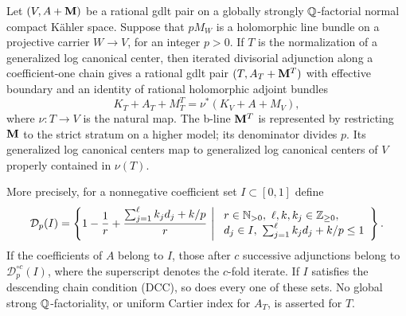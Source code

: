 \begin{lemma}
\label{lem:stratum-adjunction}
Let $(V,A+\mathbf M)$ be a rational gdlt pair on a globally strongly
$\mathbb Q$-factorial normal compact K\"ahler space.  Suppose that $pM_W$
is a holomorphic line bundle on a projective carrier $W\to V$, for
an integer $p>0$.  If $T$ is the normalization of a generalized log
canonical center, then iterated divisorial adjunction along a
coefficient-one chain gives a rational gdlt pair
$(T,A_T+\mathbf M^T)$ with effective boundary and an identity of rational
holomorphic adjoint bundles
\begin{equation}\label{eq:stratum-adjunction}
 K_T+A_T+M_T^T
   =\nu^*(K_V+A+M_V),
\end{equation}
where $\nu:T\to V$ is the natural map.  The b-line $\mathbf M^T$ is
represented by restricting $\mathbf M$ to the strict stratum on a higher
model; its denominator divides $p$.  Its generalized log canonical
centers map to generalized log canonical centers of $V$ properly
contained in $\nu(T)$.

More precisely, for a nonnegative coefficient set $I\subset[0,1]$
define
\begin{equation}\label{eq:adjunction-coefficients}
 \mathcal D_p(I)=
 \left\{
  1-\frac1r+\frac{\sum_{j=1}^{\ell}k_jd_j+k/p}{r}
  \ \middle|\ 
  \begin{array}{l}
  r\in\N_{>0},\ \ell,k,k_j\in\Z_{\geq0},\\
  d_j\in I,\ \sum_{j=1}^{\ell}k_jd_j+k/p\leq1
  \end{array}
 \right\}.
\end{equation}
If the coefficients of $A$ belong to $I$, those after $c$
successive adjunctions belong to $\mathcal D_p^{\circ c}(I)$,
where the superscript denotes the $c$-fold iterate.
If $I$ satisfies the descending chain condition (DCC), so does every
one of these sets.  No global
strong $\mathbb Q$-factoriality, or uniform Cartier index for $A_T$, is
asserted for $T$.
\end{lemma}

